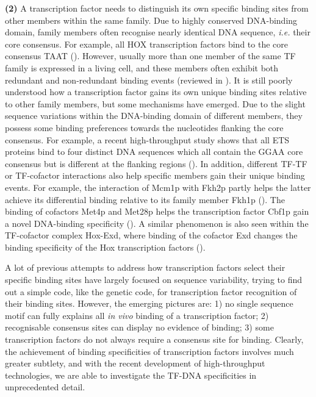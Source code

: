 \textbf{(2)} A transcription factor needs to distinguish its own specific binding sites from other members within the same family. Due to highly conserved DNA-binding domain, family members often recognise nearly identical DNA sequence, \textit{i.e.} their core consensus. For example, all HOX transcription factors bind to the core consensus TAAT (\cite{berger2008variation}). However, usually more than one member of the same TF family is expressed in a living cell, and these members often exhibit both redundant and non-redundant binding events (reviewed in \cite{farnham2009insights}). It is still poorly understood how a transcription factor gains its own unique binding sites relative to other family members, but some mechanisms have emerged. Due to the slight sequence variations within the DNA-binding domain of different members, they possess some binding preferences towards the nucleotides flanking the core consensus. For example, a recent high-throughput study shows that all ETS proteins bind to four distinct DNA sequences which all contain the GGAA core consensus but is different at the flanking regions (\cite{wei2010genome-wide}). In addition, different TF-TF or TF-cofactor interactions also help specific members gain their unique binding events. For example, the interaction of Mcm1p with Fkh2p partly helps the latter achieve its differential binding relative to its family member Fkh1p (\cite{hollenhorst2001mechanisms}). The binding of cofactors Met4p and Met28p helps the transcription factor Cbf1p gain a novel DNA-binding specificity (\cite{siggers2011non-dna-binding}). A similar phenomenon is also seen within the TF-cofactor complex Hox-Exd, where binding of the cofactor Exd changes the binding specificity of the Hox transcription factors (\cite{slattery2011cofactor}).

A lot of previous attempts to address how transcription factors select their specific binding sites have largely focused on sequence variability, trying to find out a simple code, like the genetic code, for transcription factor recognition of their binding sites. However, the emerging pictures are: 1) no single sequence motif can fully explains all \textit{in vivo} binding of a transcription factor; 2) recognisable consensus sites can display no evidence of binding; 3) some transcription factors do not always require a consensus site for binding. Clearly, the achievement of binding specificities of transcription factors involves much greater subtlety, and with the recent development of high-throughput technologies, we are able to investigate the TF-DNA specificities in unprecedented detail.


